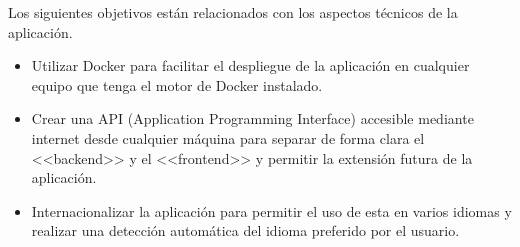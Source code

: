 Los siguientes objetivos están relacionados con los aspectos técnicos de la
aplicación.

\begin{itemize}
    \item Utilizar Docker para facilitar el despliegue de la
    aplicación en cualquier equipo que tenga el motor de Docker instalado.
    \item Crear una API (Application Programming Interface) accesible mediante
    internet desde cualquier máquina para separar de forma clara el <<backend>>
    y el <<frontend>> y permitir la extensión futura de la aplicación.
    \item Internacionalizar la aplicación para permitir el uso de esta en varios
    idiomas y realizar una detección automática del idioma preferido por el
    usuario.
\end{itemize}